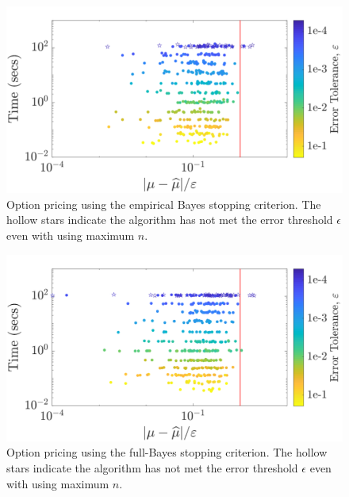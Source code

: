\documentclass[graybox,footinfo]{svmult}
\begin{document}
\begin{figure}
\centering
\includegraphics[width=0.95\linewidth]{"figures/Sobol/Sobol_optPrice_guaranteed_time_MLE__d12_r1_2019-Sep-1"}
\caption[Sobol: Option pricing guaranteed: MLE]{Option pricing using the empirical Bayes stopping criterion. The hollow stars indicate the algorithm has not met the error threshold $\epsilon$ even with using maximum $n$.}
\label{fig:Sobol-optprice-guaranteed-MLE}
\end{figure}
\begin{figure}
\centering
\includegraphics[width=0.95\linewidth]{"figures/Sobol/Sobol_optPrice_guaranteed_time_full__d12_r1_2019-Sep-1"}
\caption[Sobol: Option pricing guaranteed: Full Bayes]{Option pricing using the full-Bayes stopping criterion. The hollow stars indicate the algorithm has not met the error threshold $\epsilon$ even with using maximum $n$.}
\label{fig:Sobol-optprice-guaranteed-FB}
\end{figure}
\end{document}
